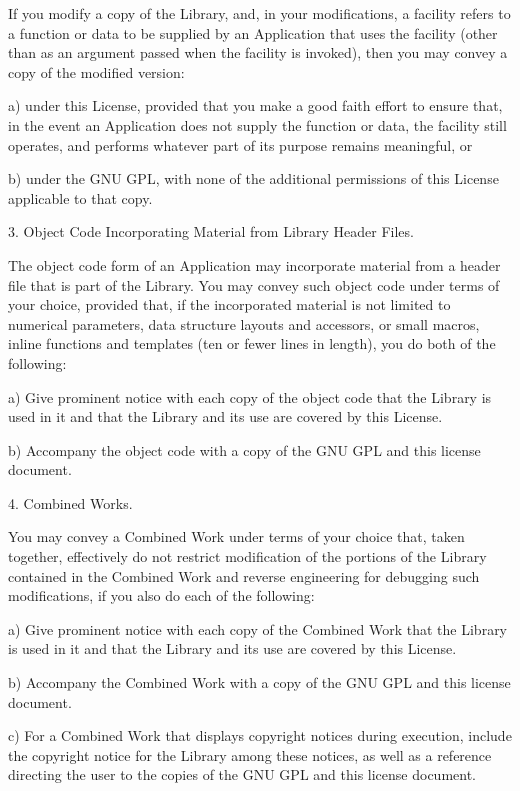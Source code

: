 \documentclass[letterpaper,10pt,english]{sphinxmanual}
\begin{document}
\begin{sphinxVerbatim}[commandchars=\\\{\}]
If you modify a copy of the Library, and, in your modifications, a facility
refers to a function or data to be supplied by an Application that uses the
facility (other than as an argument passed when the facility is invoked),
then you may convey a copy of the modified version:

    a) under this License, provided that you make a good faith effort to
    ensure that, in the event an Application does not supply the function or
    data, the facility still operates, and performs whatever part of its
    purpose remains meaningful, or

    b) under the GNU GPL, with none of the additional permissions of this
    License applicable to that copy.

3. Object Code Incorporating Material from Library Header Files.

The object code form of an Application may incorporate material from a header
file that is part of the Library. You may convey such object code under terms
of your choice, provided that, if the incorporated material is not limited to
numerical parameters, data structure layouts and accessors, or small macros,
inline functions and templates (ten or fewer lines in length),
you do both of the following:

    a) Give prominent notice with each copy of the object code that the Library
    is used in it and that the Library and its use are covered by this License.

    b) Accompany the object code with a copy of the GNU GPL
    and this license document.

4. Combined Works.

You may convey a Combined Work under terms of your choice that, taken together,
effectively do not restrict modification of the portions of the Library
contained in the Combined Work and reverse engineering for debugging such
modifications, if you also do each of the following:

    a) Give prominent notice with each copy of the Combined Work that the
    Library is used in it and that the Library and its use are covered
    by this License.

    b) Accompany the Combined Work with a copy of the GNU GPL and
    this license document.

    c) For a Combined Work that displays copyright notices during execution,
    include the copyright notice for the Library among these notices, as well
    as a reference directing the user to the copies of the GNU GPL
    and this license document.


\end{sphinxVerbatim}
\end{document}
